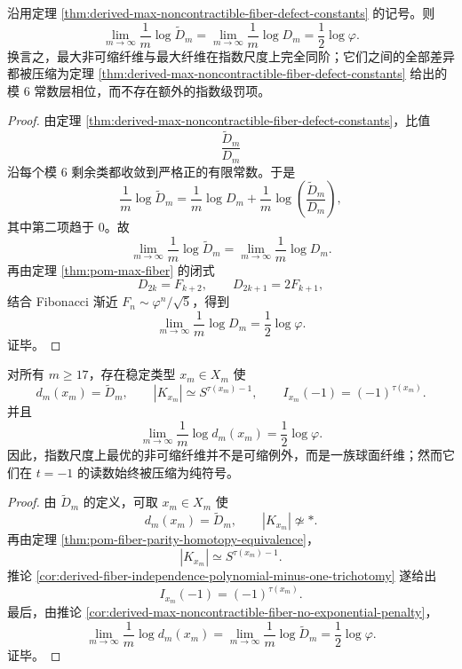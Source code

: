 \begin{corollary}[最大非可缩纤维在指数尺度上无额外罚项]\label{cor:derived-max-noncontractible-fiber-no-exponential-penalty}
沿用定理 \ref{thm:derived-max-noncontractible-fiber-defect-constants} 的记号。则
\[
\lim_{m\to\infty}\frac1m\log \widetilde D_m
=
\lim_{m\to\infty}\frac1m\log D_m
=
\frac12\log\varphi.
\]
换言之，最大非可缩纤维与最大纤维在指数尺度上完全同阶；它们之间的全部差异都被压缩为定理 \ref{thm:derived-max-noncontractible-fiber-defect-constants} 给出的模 \(6\) 常数层相位，而不存在额外的指数级罚项。
\end{corollary}
\begin{proof}
由定理 \ref{thm:derived-max-noncontractible-fiber-defect-constants}，比值
\[
\frac{\widetilde D_m}{D_m}
\]
沿每个模 \(6\) 剩余类都收敛到严格正的有限常数。于是
\[
\frac1m\log \widetilde D_m
=
\frac1m\log D_m+\frac1m\log\!\left(\frac{\widetilde D_m}{D_m}\right),
\]
其中第二项趋于 \(0\)。故
\[
\lim_{m\to\infty}\frac1m\log \widetilde D_m
=
\lim_{m\to\infty}\frac1m\log D_m.
\]
再由定理 \ref{thm:pom-max-fiber} 的闭式
\[
D_{2k}=F_{k+2},
\qquad
D_{2k+1}=2F_{k+1},
\]
结合 Fibonacci 渐近 \(F_n\sim \varphi^n/\sqrt5\)，得到
\[
\lim_{m\to\infty}\frac1m\log D_m=\frac12\log\varphi.
\]
证毕。
\end{proof}

\begin{corollary}\label{cor:derived-optimal-spherical-fiber-sign-compression}
对所有 \(m\ge 17\)，存在稳定类型 \(x_m\in X_m\) 使
\[
d_m(x_m)=\widetilde D_m,
\qquad
|K_{x_m}|\simeq S^{\tau(x_m)-1},
\qquad
I_{x_m}(-1)=(-1)^{\tau(x_m)}.
\]
并且
\[
\lim_{m\to\infty}\frac1m\log d_m(x_m)=\frac12\log\varphi.
\]
因此，指数尺度上最优的非可缩纤维并不是可缩例外，而是一族球面纤维；然而它们在 \(t=-1\) 的读数始终被压缩为纯符号。
\end{corollary}
\begin{proof}
由 \(\widetilde D_m\) 的定义，可取 \(x_m\in X_m\) 使
\[
d_m(x_m)=\widetilde D_m,
\qquad
|K_{x_m}|\not\simeq \ast.
\]
再由定理 \ref{thm:pom-fiber-parity-homotopy-equivalence}，
\[
|K_{x_m}|\simeq S^{\tau(x_m)-1}.
\]
推论 \ref{cor:derived-fiber-independence-polynomial-minus-one-trichotomy} 遂给出
\[
I_{x_m}(-1)=(-1)^{\tau(x_m)}.
\]
最后，由推论 \ref{cor:derived-max-noncontractible-fiber-no-exponential-penalty}，
\[
\lim_{m\to\infty}\frac1m\log d_m(x_m)
=
\lim_{m\to\infty}\frac1m\log \widetilde D_m
=
\frac12\log\varphi.
\]
证毕。
\end{proof}
